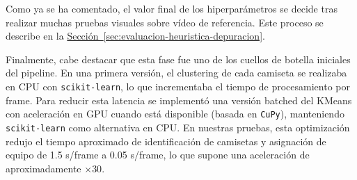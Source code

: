 Como ya se ha comentado, el valor final de los hiperparámetros se decide tras realizar muchas pruebas visuales sobre vídeo de referencia. Este proceso se describe en la \hyperref[sec:evaluacion-heuristica-depuracion]{Sección~\ref*{sec:evaluacion-heuristica-depuracion}}.

Finalmente, cabe destacar que esta fase fue uno de los cuellos de botella iniciales del pipeline. En una primera versión, el clustering de cada camiseta se realizaba en CPU con \texttt{scikit-learn}, lo que incrementaba el tiempo de procesamiento por frame. Para reducir esta latencia se implementó una versión batched del KMeans con aceleración en GPU cuando está disponible (basada en \texttt{CuPy}), manteniendo \texttt{scikit-learn} como alternativa en CPU. En nuestras pruebas, esta optimización redujo el tiempo aproximado de identificación de camisetas y asignación de equipo de 1.5 s/frame a 0.05 s/frame, lo que supone una aceleración de aproximadamente $\times30$.